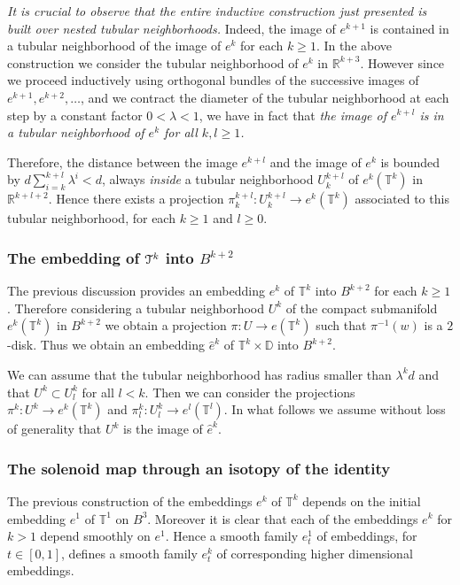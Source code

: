 \documentclass[reqno,12pt,a4paper]{amsart}
\theoremstyle{plain}
\theoremstyle{definition}
\begin{document}
\emph{It is crucial to observe that the entire inductive
  construction just presented is built over nested tubular
  neighborhoods.} Indeed, the image of $e^{k+1}$ is
contained in a tubular neighborhood of the image of $e^k$
for each $k\ge1$. In the above construction we consider the
tubular neighborhood of $e^k$ in ${{\mathbb R}}^{k+3}$. However since
we proceed inductively using orthogonal bundles of the
successive images of $e^{k+1}, e^{k+2},\dots$, and we
contract the diameter of the tubular neighborhood at each
step by a constant factor $0<\lambda<1$, we have in fact
that \emph{the image of $e^{k+l}$ is in a tubular
  neighborhood of $e^{k}$ for all $k,l\ge1$.}

Therefore, the distance between the image $e^{k+l}$ and the
image of $e^k$ is bounded by $d\sum_{i=k}^{k+l}\lambda^i<d$,
always \emph{inside} a tubular neighborhood $U^{k+l}_k$ of
$e^k({{\mathbb T}}^k)$ in ${{\mathbb R}}^{k+l+2}$. Hence there exists a
projection $\pi_k^{k+l}:U^{k+l}_k\to e^k({{\mathbb T}}^k)$ associated
to this tubular neighborhood, for each $k\ge1$ and $l\ge0$.

\subsubsection{The embedding of ${\EuScript{T}}^k$ into $B^{k+2}$}
\label{sec:embedd-ct-into}

The previous discussion provides an embedding $e^k$ of
${{\mathbb T}}^k$ into $B^{k+2}$ for each $k\ge1$. Therefore
considering a tubular neighborhood $U^k$ of the compact
submanifold $e^k({{\mathbb T}}^k)$ in $B^{k+2}$ we obtain a projection
$\pi:U\to e({{\mathbb T}}^k)$ such that $\pi^{-1}(w)$ is a
$2$-disk. Thus we obtain an embedding $\hat e^k$ of
${{\mathbb T}}^k\times{{\mathbb D}}$ into $B^{k+2}$.

We can assume that the tubular neighborhood has radius
smaller than $\lambda^k d$ and that $U^k\subset U^k_l$ for
all $l<k$.  Then we can consider the projections
$\pi^k:U^k\to e^k({{\mathbb T}}^k)$ and $\pi^k_l:U^k_l\to e^l({{\mathbb T}}^l)$.
In what follows we assume without loss of generality that
$U^k$ is the image of $\hat e^k$.

\subsubsection{The solenoid map through an isotopy of the identity}
\label{sec:soleno-map-through}

The previous construction of the embeddings $e^k$ of
${{\mathbb T}}^k$ depends on the initial embedding $e^1$ of ${{\mathbb T}}^1$ on
$B^3$. Moreover it is clear that each of the embeddings
$e^k$ for $k>1$ depend smoothly on $e^1$. Hence a smooth
family $e^1_t$ of embeddings, for $t\in[0,1]$, defines a
smooth family $e^k_t$ of corresponding higher dimensional
embeddings.
\end{document}
